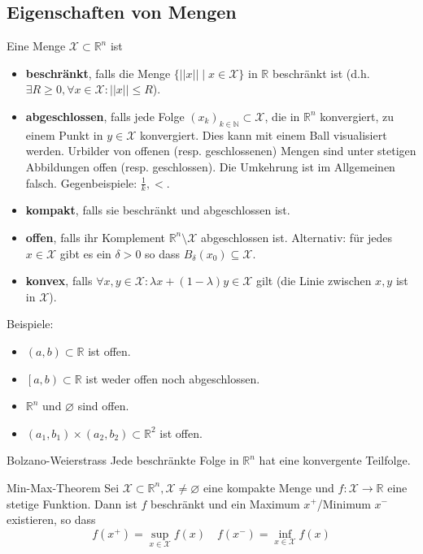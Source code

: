 \documentclass[a4paper,10pt]{article}
\def\R{\mathbb{R}}
\def\N{\mathbb{N}}
\def\X{\mathcal{X}}
\begin{document}
\subsection{Eigenschaften von Mengen}
Eine Menge \(\X \subset \R^n \) ist
\begin{itemize}
  \item \textbf{beschränkt}, falls die Menge \(\{ ||x|| \mid x \in \X \}\) in \(\R\) beschränkt ist (d.h. \(\exists R \ge 0, \forall x \in \X: ||x|| \le R\)).
  \item \textbf{abgeschlossen}, falls jede Folge \((x_k)_{k\in \N} \subset \X\), die in \(\R^n\) konvergiert, zu einem Punkt in \(y \in \X\) konvergiert. Dies kann mit einem Ball visualisiert werden. Urbilder von offenen (resp. geschlossenen) Mengen sind unter stetigen Abbildungen offen (resp. geschlossen). Die Umkehrung ist im Allgemeinen falsch. Gegenbeispiele: \(\frac{1}{k}, <\).
  \item \textbf{kompakt}, falls sie beschränkt und abgeschlossen ist.
  \item \textbf{offen}, falls ihr Komplement \(\R^n \setminus \X\) abgeschlossen ist. Alternativ: für jedes $x \in \X$ gibt es ein $\delta > 0$ so dass $B_\delta(x_0) \subseteq \X$.
  \item \textbf{konvex}, falls \(\forall x, y \in \X: \lambda x + (1 - \lambda)y \in \X\) gilt (die Linie zwischen \(x, y\) ist in \(\X\)).
\end{itemize}
Beispiele:
\begin{itemize}
  \item \((a,b) \subset \R\) ist offen.
  \item \(\left[a,b\right) \subset \R\) ist weder offen noch abgeschlossen.
  \item \(\R^n\) und \(\varnothing\) sind offen.
  \item \((a_1, b_1) \times (a_2,b_2) \subset \R^2\) ist offen.
\end{itemize}
\begin{subbox}{Bolzano-Weierstrass}
  Jede beschränkte Folge in \(\R^n\) hat eine konvergente Teilfolge.
\end{subbox}
\begin{subbox}{Min-Max-Theorem}
  Sei \(\X \subset \R^n, \X \ne \varnothing\) eine kompakte Menge und \(f: \X \to \R\) eine stetige Funktion. Dann ist \(f\) beschränkt und ein Maximum \(x^+\)/Minimum \(x^-\)existieren, so dass
  \[f(x^+) = \sup_{x\in \X} f(x) \quad f(x^-) = \inf_{x \in \X} f(x)\]
\end{subbox}
\end{document}
